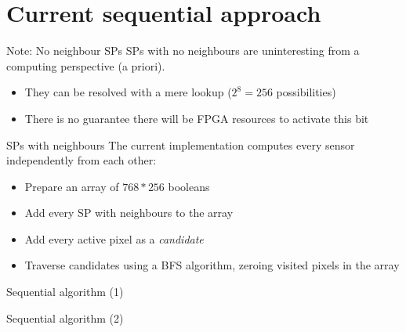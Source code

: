 \section{Current sequential approach}

\begin{frame}{Note: No neighbour SPs}
SPs with no neighbours are uninteresting from a computing perspective (a priori).

\begin{itemize}
\item They can be resolved with a mere lookup ($2^8 = 256$ possibilities)
\item There is no guarantee there will be FPGA resources to activate this bit
\end{itemize}
\end{frame}

\begin{frame}{SPs with neighbours}
The current implementation computes every sensor independently from each other:

\begin{itemize}
\item Prepare an array of $768 * 256$ booleans
\item Add every SP with neighbours to the array
\item Add every active pixel as a \emph{candidate}
\item Traverse candidates using a BFS algorithm, zeroing visited pixels in the array
\end{itemize}
\end{frame}

\begin{frame}{Sequential algorithm (1)}
\begin{center}
\end{center}
\end{frame}

\begin{frame}{Sequential algorithm (2)}
\begin{center}
\end{center}
\end{frame}

